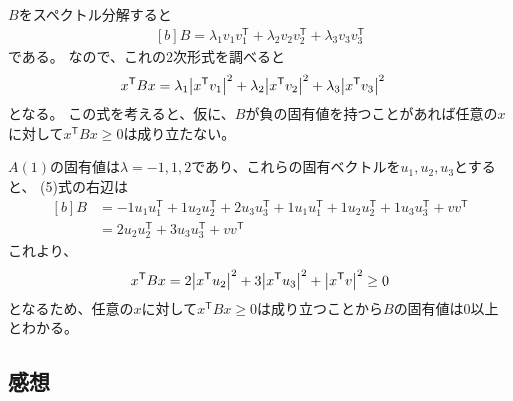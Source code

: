 \documentclass[../../sp_2023.tex]{subfiles}
\begin{document}
\subsubsection{}
\(B\)をスペクトル分解すると
\begin{equation}\begin{aligned}[b]
    B = \lambda_1 v_1v_1^\mathsf{T}+\lambda_2v_2v_2^\mathsf{T}+\lambda_3v_3v_3^\mathsf{T}
\end{aligned}\end{equation}
である。
なので、これの2次形式を調べると
\begin{equation}\begin{aligned}[b]
    x^\mathsf{T}Bx &= \lambda_1 \abs{x^\mathsf{T}v_1}^2 + \lambda_2 \abs{x^\mathsf{T}v_2}^2 + \lambda_3 \abs{x^\mathsf{T}v_3}^2
\end{aligned}\end{equation}
となる。
この式を考えると、仮に、\(B\)が負の固有値を持つことがあれば任意の\(x\)に対して\(x^\mathsf{T}Bx\geq 0\)は成り立たない。

\(A(1)\)の固有値は\(\lambda=-1,1,2\)であり、これらの固有ベクトルを\(u_1,u_2,u_3\)とすると、
(5)式の右辺は
\begin{equation}\begin{aligned}[b]
    B &= -1u_1u_1^\mathsf{T}+1u_2u_2^\mathsf{T}+2u_3u_3^\mathsf{T}+1u_1u_1^\mathsf{T}+1u_2u_2^\mathsf{T}+1u_3u_3^\mathsf{T}+vv^\mathsf{T}\\
    &= 2u_2u_2^\mathsf{T}+3u_3u_3^\mathsf{T}+vv^\mathsf{T}
\end{aligned}\end{equation}
これより、
\begin{equation}\begin{aligned}[b]
    x^\mathsf{T} B x = 2\abs{x^\mathsf{T}u_2}^2+3\abs{x^\mathsf{T}u_3}^2+\abs{x^\mathsf{T}v}^2 \geq 0
\end{aligned}\end{equation}
となるため、任意の\(x\)に対して\(x^\mathsf{T}Bx\geq 0\)は成り立つことから\(B\)の固有値は0以上とわかる。

\subsection*{感想}
\end{document}
